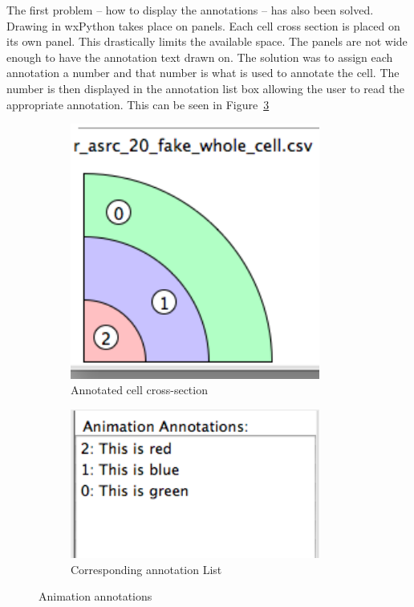 The first problem -- how to display the annotations -- has also been solved.  Drawing in wxPython takes place on panels.  Each cell cross section is placed on its own panel.  This drastically limits the available space.  The panels are not wide enough to have the annotation text drawn on.  The solution was to assign each annotation a number and that number is what is used to annotate the cell.  The number is then displayed in the annotation list box allowing the user to read the appropriate annotation.  This can be seen in Figure~\ref{fig:annotation_whole}

\begin{figure}[h!]
    \centering
    \begin{subfigure}[b]{0.4\textwidth}
        \centering
        \includegraphics[width=0.9\textwidth]{images/annotation_whole_b.png}
        \caption{Annotated cell cross-section}
        \label{fig:annotation_whole_cell}
    \end{subfigure}
    \begin{subfigure}[b]{0.4\textwidth}
        \centering
        \includegraphics[width=0.9\textwidth]{images/annotation_whole_a.png}
        \caption{Corresponding annotation List}
        \label{fig:annotation_whole_list}
    \end{subfigure}
    \caption{Animation annotations}
    \label{fig:annotation_whole}
\end{figure}

